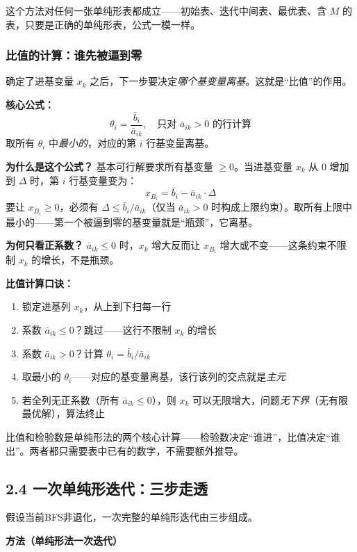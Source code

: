 这个方法对任何一张单纯形表都成立——初始表、迭代中间表、最优表、含 $M$ 的表，只要是正确的单纯形表，公式一模一样。

\subsubsection{比值的计算：谁先被逼到零}

确定了进基变量 $x_k$ 之后，下一步要决定\emph{哪个基变量离基}。这就是“比值”的作用。

\textbf{核心公式：}
\[
\theta_i = \frac{\bar{b}_i}{\bar{a}_{ik}}, \quad \text{只对 } \bar{a}_{ik} > 0 \text{ 的行计算}
\]
取所有 $\theta_i$ 中\emph{最小的}，对应的第 $i$ 行基变量离基。

\textbf{为什么是这个公式？} 基本可行解要求所有基变量 $\ge 0$。当进基变量 $x_k$ 从 $0$ 增加到 $\Delta$ 时，第 $i$ 行基变量变为：
\[
x_{B_i} = \bar{b}_i - \bar{a}_{ik} \cdot \Delta
\]
要让 $x_{B_i} \ge 0$，必须有 $\Delta \le \bar{b}_i / \bar{a}_{ik}$（仅当 $\bar{a}_{ik} > 0$ 时构成上限约束）。取所有上限中最小的——第一个被逼到零的基变量就是“瓶颈”，它离基。

\textbf{为何只看正系数？} $\bar{a}_{ik}\le 0$ 时，$x_k$ 增大反而让 $x_{B_i}$ 增大或不变——这条约束不限制 $x_k$ 的增长，不是瓶颈。

\textbf{比值计算口诀：}
\begin{enumerate}
  \item 锁定进基列 $x_k$，从上到下扫每一行
  \item 系数 $\bar{a}_{ik} \le 0$？跳过——这行不限制 $x_k$ 的增长
  \item 系数 $\bar{a}_{ik} > 0$？计算 $\theta_i = \bar{b}_i / \bar{a}_{ik}$
  \item 取最小的 $\theta_i$——对应的基变量离基，该行该列的交点就是\emph{主元}
  \item 若全列无正系数（所有 $\bar{a}_{ik} \le 0$），则 $x_k$ 可以无限增大，问题\emph{无下界}（无有限最优解），算法终止
\end{enumerate}

比值和检验数是单纯形法的两个核心计算——检验数决定“谁进”，比值决定“谁出”。两者都只需要表中已有的数字，不需要额外推导。

\subsection{2.4 一次单纯形迭代：三步走透}

假设当前BFS非退化，一次完整的单纯形迭代由三步组成。

\textbf{方法（单纯形法一次迭代）}

